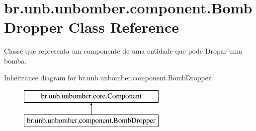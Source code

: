 \hypertarget{classbr_1_1unb_1_1unbomber_1_1component_1_1_bomb_dropper}{\section{br.\+unb.\+unbomber.\+component.\+Bomb\+Dropper Class Reference}
\label{classbr_1_1unb_1_1unbomber_1_1component_1_1_bomb_dropper}
}


Classe que representa um componente de uma entidade que pode Dropar uma bomba.  


Inheritance diagram for br.\+unb.\+unbomber.\+component.\+Bomb\+Dropper\+:\begin{figure}[H]
\begin{center}
\leavevmode
\includegraphics[height=2.000000cm]{classbr_1_1unb_1_1unbomber_1_1component_1_1_bomb_dropper}
\end{center}
\end{figure}
